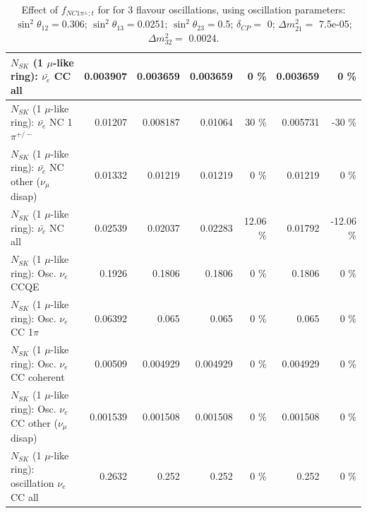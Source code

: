 \begin{table}
\begin{tabular}{| l | r | r | r  r | r  r |}
                            $N_{SK}$ (1 $\mu$-like ring): $\bar{\nu_{e}}$ CC all &        0.003907 &        0.003659 &        0.003659 &        0 \%  &        0.003659 &        0 \%  \\ 
\hline
                     $N_{SK}$ (1 $\mu$-like ring): $\bar{\nu_e}$ NC 1$\pi^{+/-}$ &         0.01207 &        0.008187 &         0.01064 &       30 \%  &        0.005731 &      -30 \%  \\ 
          $N_{SK}$ (1 $\mu$-like ring): $\bar{\nu_e}$ NC other ($\nu_\mu$ disap) &         0.01332 &         0.01219 &         0.01219 &        0 \%  &         0.01219 &        0 \%  \\ 
                            $N_{SK}$ (1 $\mu$-like ring): $\bar{\nu_{e}}$ NC all &         0.02539 &         0.02037 &         0.02283 &    12.06 \%  &         0.01792 &   -12.06 \%  \\ 
\hline
\hline
\hline
                                 $N_{SK}$ (1 $\mu$-like ring): Osc. $\nu_e$ CCQE &          0.1926 &          0.1806 &          0.1806 &        0 \%  &          0.1806 &        0 \%  \\ 
                            $N_{SK}$ (1 $\mu$-like ring): Osc. $\nu_e$ CC 1$\pi$ &         0.06392 &           0.065 &           0.065 &        0 \%  &           0.065 &        0 \%  \\ 
                          $N_{SK}$ (1 $\mu$-like ring): Osc. $\nu_e$ CC coherent &         0.00509 &        0.004929 &        0.004929 &        0 \%  &        0.004929 &        0 \%  \\ 
           $N_{SK}$ (1 $\mu$-like ring): Osc. $\nu_e$ CC other ($\nu_\mu$ disap) &        0.001539 &        0.001508 &        0.001508 &        0 \%  &        0.001508 &        0 \%  \\ 
                        $N_{SK}$ (1 $\mu$-like ring): oscillation $\nu_e$ CC all &          0.2632 &           0.252 &           0.252 &        0 \%  &           0.252 &        0 \%  \\ 
\hline
\hline
\end{tabular}
\caption{ Effect of $f_{NC1\pi^\pm; t}$ for for 3 flavour oscillations, using oscillation parameters:  $\sin^2\theta_{12} = $0.306; $\sin^2\theta_{13} = $0.0251; $\sin^2\theta_{23} = $0.5; $\delta_{CP} = $        0; $\Delta m^2_{21} = $    7.5e-05; $\Delta m^2_{32} = $    0.0024. }
\label{tab:num_xsec_norm_nc1piC_1RmuT_3f_osc_t13:0.0251}
\end{table}
\clearpage
